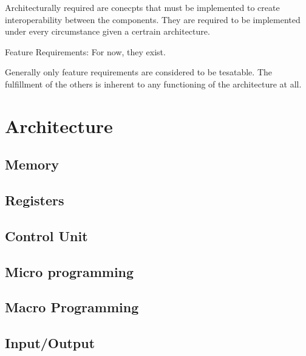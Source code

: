 \newtheorem{arch-requirement}{Arch. Req.}[subsection]
Architecturally required are conecpts that must be implemented to create interoperability between the components. They are required to be implemented under every circumstance given a certrain architecture. 

\newtheorem{feat-requirement}{Feat. Req.}[subsection]
Feature Requirements: For now, they exist.


Generally only feature requirements are considered to be tesatable. The fulfillment of the others is inherent to any functioning of the architecture at all. 

\section{Architecture}



\subsection{Memory}



\subsection{Registers}

\subsection{Control Unit}

\subsection{Micro programming}

\subsection{Macro Programming}

\subsection{Input/Output}

